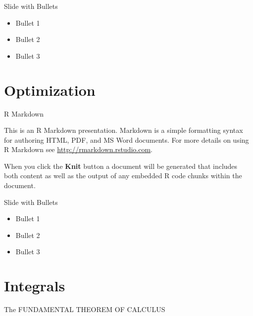 \documentclass[
  ignorenonframetext,
]{beamer}
\providecommand{\tightlist}{%
  \setlength{\itemsep}{0pt}\setlength{\parskip}{0pt}}
\begin{document}
\begin{frame}{Slide with Bullets}
\protect\hypertarget{slide-with-bullets-1}{}

\begin{itemize}
\tightlist
\item
  Bullet 1
\item
  Bullet 2
\item
  Bullet 3
\end{itemize}

\end{frame}

\hypertarget{optimization}{%
\section{Optimization}\label{optimization}}

\begin{frame}{R Markdown}
\protect\hypertarget{r-markdown-2}{}

This is an R Markdown presentation. Markdown is a simple formatting
syntax for authoring HTML, PDF, and MS Word documents. For more details
on using R Markdown see \url{http://rmarkdown.rstudio.com}.

When you click the \textbf{Knit} button a document will be generated
that includes both content as well as the output of any embedded R code
chunks within the document.

\end{frame}

\begin{frame}{Slide with Bullets}
\protect\hypertarget{slide-with-bullets-2}{}

\begin{itemize}
\tightlist
\item
  Bullet 1
\item
  Bullet 2
\item
  Bullet 3
\end{itemize}

\end{frame}

\hypertarget{integrals}{%
\section{Integrals}\label{integrals}}

\begin{frame}{The FUNDAMENTAL THEOREM OF CALCULUS}
\protect\hypertarget{the-fundamental-theorem-of-calculus}{}

\end{frame}
\end{document}
